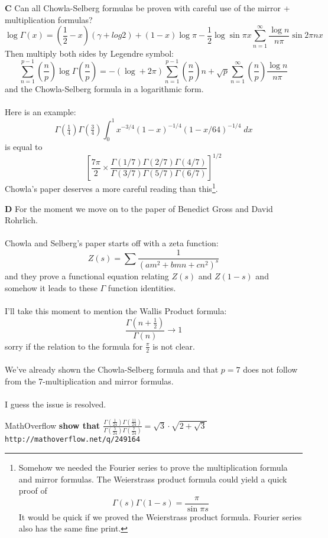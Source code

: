 \documentclass[12pt]{article}
\begin{document}
\noindent \textbf{C} Can all Chowla-Selberg formulas be proven with careful use of the mirror + multiplication formulas?
$$ 
\log \Gamma(x)
= 
\left( \frac{1}{2}-x\right)(\gamma + log 2)
+ (1-x)\log \pi - \frac{1}{2} \log \sin \pi x
 \sum_{n=1}^\infty \frac{\log n}{n\pi}\sin 2 \pi n x
$$
Then multiply both sides by Legendre symbol:
$$
\sum_{n=1}^{p-1} \left(\frac{n}{p} \right)
\log \Gamma \left(\frac{n}{p} \right)
= - (\log + 2\pi ) \sum_{n=1}^{p-1} \left(\frac{n}{p} \right) n
+ \sqrt{p} \sum_{n=1}^\infty \left(\frac{n}{p} \right) \frac{\log n }{n \pi}
 $$
 and the Chowla-Selberg formula in a logarithmic form. \\ \\ 
 Here is an example:
$$  \Gamma(\tfrac{1}{4}) \Gamma(\tfrac{3}{4})\int_0^1  x^{-3/4}(1-x)^{-1/4}(1 - x/64)^{-1/4} \; dx $$
is equal to
$$ \left[  \frac{7\pi}{2} \times 
\frac{ \Gamma(1/7)\Gamma(2/7)\Gamma(4/7)}{
\Gamma(3/7)\Gamma(5/7)\Gamma(6/7)}
 \right]^{1/2}$$
Chowla's paper deserves a more careful reading than this\footnote{Somehow we needed the Fourier series to prove the multiplication formula and mirror formulas.  The Weierstrass product formula could yield a quick proof of $$ \Gamma(s) \Gamma(1-s) = \frac{\pi}{\sin \pi s} $$ It would be quick if we proved the Weierstrass product formula.  Fourier series also has the same fine print.}. 

\newpage

\noindent \textbf{D} For the moment we move on to the paper of Benedict Gross and David Rohrlich. \\ \\
Chowla and Selberg's paper starts off with a zeta function:
$$ Z(s) = \sum \frac{1}{(am^2 + bmn + cn^2)^s} $$
and they prove a functional equation relating $Z(s)$ and $Z(1-s)$ and somehow it leads to these $\Gamma$ function identities.  \\ \\
I'll take this moment to mention the Wallis Product formula:
$$ \frac{\Gamma(n + \frac{1}{2})}{\Gamma(n)} \to 1$$
sorry if the relation to the formula for $\frac{\pi}{2}$ is not clear. \\ \\
We've already shown the Chowla-Selberg formula and that $p=7$ does not follow from the 7-multiplication and mirror formulas. \\ \\
I guess the issue is resolved.  

\newpage

\selectfont \fontsize{12}{10}\selectfont

\begin{thebibliography}{}


\item MathOverflow  \textbf{show that $ \frac{\Gamma(\frac{1}{24})\Gamma(\frac{11}{24})}{\Gamma(\frac{5}{24})\Gamma(\frac{7}{24})} = \sqrt{3}\cdot \sqrt{2 + \sqrt{3}} $} \texttt{http://mathoverflow.net/q/249164}

\end{thebibliography}
\end{document}
